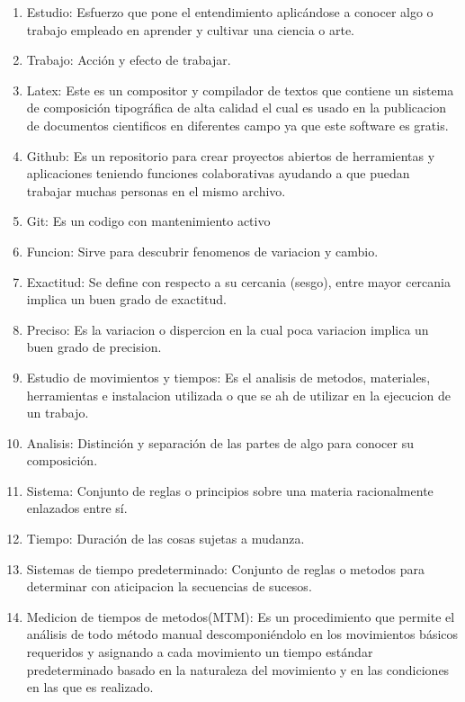 \begin{enumerate}
    \item Estudio: Esfuerzo que pone el entendimiento aplicándose a conocer algo o   trabajo empleado en aprender y cultivar una ciencia o arte.
    \cite{DiapositivasSema-2-21}
    \item Trabajo: Acción y efecto de trabajar.
    \cite{DiapositivasSema-2-21}
    \item Latex: Este es un compositor y compilador de textos que contiene un sistema de composición tipográfica de alta calidad el cual es usado en la publicacion de documentos cientificos en diferentes campo ya que este software es gratis.
    \cite{brys2019tesis}
    \item Github: Es un repositorio  para crear proyectos abiertos de herramientas y aplicaciones teniendo funciones colaborativas ayudando a que puedan trabajar muchas personas en el mismo archivo. 
    \cite{yúbalfernández_2019}
    \item Git: Es un codigo con mantenimiento activo
    \cite{astigarraga2022se}
    \item Funcion: Sirve para descubrir fenomenos de variacion y cambio.
    \item Exactitud: Se define con respecto a su cercania (sesgo), entre mayor cercania implica un buen grado de exactitud.  
    \item Preciso: Es la variacion o dispercion en la cual poca variacion implica un buen grado de precision.
    \item Estudio de movimientos y tiempos: Es el analisis de metodos, materiales, herramientas e instalacion utilizada o que se ah de utilizar en la ejecucion de un trabajo.
    \item Analisis: Distinción y separación de las partes de algo para conocer su composición.
    \cite{RAE2023}
    \item Sistema: Conjunto de reglas o principios sobre una materia racionalmente enlazados entre sí.
    \cite{asale_rae_2023}
    \item Tiempo: Duración de las cosas sujetas a mudanza.
    \item Sistemas de tiempo predeterminado: Conjunto de reglas o metodos para determinar con aticipacion la secuencias de sucesos.
    \cite{DiapositivasSema-2-21}
    \item Medicion de tiempos de metodos(MTM): Es un procedimiento que permite el análisis de todo método manual descomponiéndolo en los movimientos básicos requeridos y asignando a cada movimiento un tiempo estándar predeterminado basado en la naturaleza del movimiento y en las condiciones en las que es realizado.

\end{enumerate}
